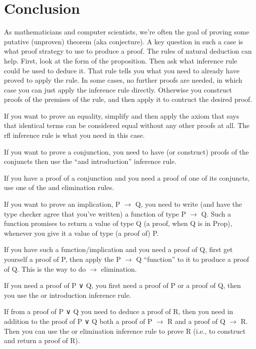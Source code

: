 \documentclass[letterpaper,10pt,english]{sphinxmanual}
\begin{document}
\begin{sphinxVerbatim}[commandchars=\\\{\}]
 
\end{sphinxVerbatim}


\section{Conclusion}
\label{\detokenize{15-proofs:conclusion}}
As mathematicians and computer scientists, we’re often the goal of
proving some putative (unproven) theorem (aka conjecture). A key
question in such a case is what proof strategy to use to produce a
proof. The rules of natural deduction can help.  First, look at the
form of the proposition. Then ask what inference rule could be used to
deduce it. That rule tells you what you need to already have proved to
apply the rule. In some cases, no further proofs are needed, in which
case you can just apply the inference rule directly. Otherwise you
construct proofs of the premises of the rule, and then apply it to
contruct the desired proof.

If you want to prove an equality, simplify and then apply the axiom
that says that identical terms can be considered equal without any
other proofs at all. The rfl inference rule is what you need in this
case.

If you want to prove a conjunction, you need to have (or construct)
proofs of the conjuncts then use the “and introduction” inference
rule.

If you have a proof of a conjunction and you need a proof of one of
its conjuncts, use one of the and elimination rules.

If you want to prove an implication, P \(\rightarrow\) Q, you need to write (and
have the type checker agree that you’ve written) a function of type P
\(\rightarrow\) Q. Such a function promises to return a value of type Q (a proof,
when Q is in Prop), whenever you give it a value of type (a proof
of) P.

If you have such a function/implication and you need a proof of Q,
first get yourself a proof of P, then apply the P \(\rightarrow\) Q “function” to it
to produce a proof of Q. This is the way to do \(\rightarrow\) elimination.

If you need a proof of P ∨ Q, you first need a proof of P or a proof
of Q, then you use the or introduction inference rule.

If from a proof of P ∨ Q you need to deduce a proof of R, then you
need in addition to the proof of P ∨ Q both a proof of P \(\rightarrow\) R and a
proof of Q \(\rightarrow\) R. Then you can use the or elimination inference rule to
prove R (i.e., to construct and return a proof of R).
\end{document}
